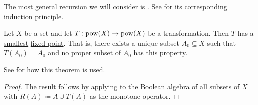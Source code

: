\begin{theorem}\label{thm:structural_recursion}
  The most general recursion we will consider is . See  for its corresponding induction principle.

  Let \( X \) be a set and let \( T: \operatorname{pow}(X) \to \operatorname{pow}(X) \) be a transformation. Then \( T \) has a \hyperref[def:poset_extremal_points/maximum_and_minimum]{smallest} \hyperref[def:fixed_point]{fixed point}. That is, there exists a unique subset \( A_0 \subseteq X \) such that \( T(A_0) = A_0 \) and no proper subset of \( A_0 \) has this property.

  See  for how this theorem is used.
\end{theorem}
\begin{proof}
  The result follows by applying  to the \hyperref[thm:boolean_algebra_of_subsets]{Boolean algebra of all subsets} of \( X \) with \( R(A) \coloneqq A \cup T(A) \) as the monotone operator.
\end{proof}


